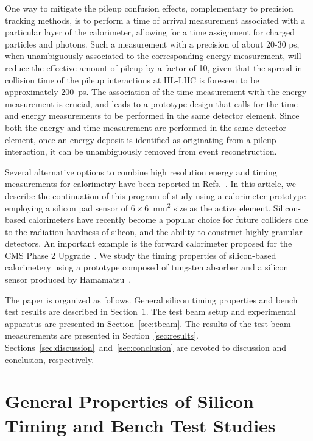 \documentclass[12pt]{article}
\begin{document}
{One way to mitigate the pileup confusion effects, complementary to precision
tracking methods, is to perform a time of arrival measurement associated with a
particular layer of the calorimeter, allowing for a time assignment for 
charged particles and photons. Such a measurement with a precision of about
20-30 ps, when unambiguously associated to the corresponding energy measurement,
will reduce the effective amount of pileup by a factor of 10, given that the
spread in collision time of the pileup interactions at HL-LHC is foreseen to be
approximately 200~ps. The association of the time measurement with the energy
measurement is crucial, and leads to a prototype design that calls for the time
and energy measurements to be performed in the same detector element. Since both
the energy and time measurement are performed in the same detector element, once
an energy deposit is identified as originating from a pileup interaction, it can
be unambiguously removed from event reconstruction.

Several alternative options to combine high resolution energy and timing
measurements for calorimetry have been reported in Refs.~\cite{Anderson:2015gha,
MCPFastCaloNIMA, Ronzhin2015288, Ronzhin201552, Brianza2015216}. In this
article, we describe the continuation of this program of study using a
calorimeter prototype employing a silicon pad sensor of $6\times 6$~mm$^2$ size
as the active element. Silicon-based calorimeters have recently become a popular
choice for future colliders due to the radiation hardness of silicon, and the
ability to construct highly granular detectors. An important example is the
forward calorimeter proposed for the CMS Phase 2 Upgrade~\cite{Butler:2020886}.
We study the timing properties of silicon-based calorimetery using a prototype
composed of tungsten absorber and a silicon sensor produced by
Hamamatsu~\cite{hamamatsu}. 

The paper is organized as follows. General silicon timing properties and bench
test results are described in Section~\ref{sec:siliconpad}. The test beam setup
and experimental apparatus are presented in Section~\ref{sec:tbeam}. The results
of the test beam measurements are presented in Section~\ref{sec:results}.
Sections~\ref{sec:discussion}~and~\ref{sec:conclusion} are devoted to discussion
and conclusion, respectively.


\section{General Properties of Silicon Timing and Bench Test Studies}
\label{sec:siliconpad}

}
\end{document}
